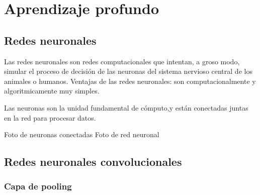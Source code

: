 \begin{comment}
\section{Visión por computador}
La visión por computador (VC) \cite{15} es un campo de la inteligencia artificial (IA) que permite a las computadoras y sistemas obtener información significativa a partir de imágenes digitales, vídeos y otras entradas visuales, y realizar acciones en base a esa información.

La visión por computador requiere una gran cantidad de datos. Realiza el análisis de los datos una y otra vez hasta que distingue diferencias o patrones y, en última instancia, reconoce imágenes. 

Se utilizan dos tecnologías esenciales para lograr esto: un tipo de aprendizaje automático llamado aprendizaje profundo (deep learning, DL) y las redes neuronales convolucionales (convolutional neuronal networks, CNNs).
\end{comment}


\section{Aprendizaje profundo}

\subsection{Redes neuronales}
Las redes neuronales son redes computacionales que intentan, a groso modo, simular el proceso de decisión de las neuronas del sistema nervioso central de los animales o humanos. Ventajas de las redes neuronales: son computacionalmente y algoritmicamente muy simples.

Las neuronas son la unidad fundamental de cómputo,y están conectadas juntas en la red para procesar datos.


Foto de neuronas conectadas
Foto de red neuronal


\subsection{Redes neuronales convolucionales}


\subsubsection*{Capa de pooling}